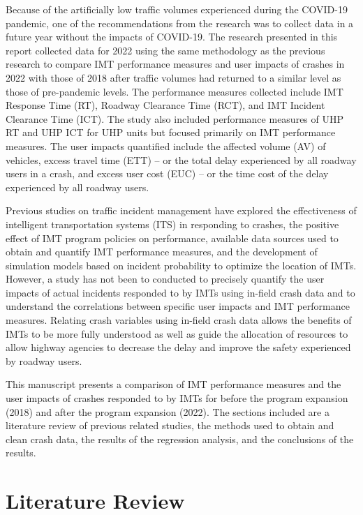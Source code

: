 \documentclass[
  letterpaper,
  authoryear]{elsarticle}
\begin{document}
Because of the artificially low traffic volumes experienced during the
COVID-19 pandemic, one of the recommendations from the research was to
collect data in a future year without the impacts of COVID-19. The
research presented in this report collected data for 2022 using the same
methodology as the previous research to compare IMT performance measures
and user impacts of crashes in 2022 with those of 2018 after traffic
volumes had returned to a similar level as those of pre-pandemic levels.
The performance measures collected include IMT Response Time (RT),
Roadway Clearance Time (RCT), and IMT Incident Clearance Time (ICT). The
study also included performance measures of UHP RT and UHP ICT for UHP
units but focused primarily on IMT performance measures. The user
impacts quantified include the affected volume (AV) of vehicles, excess
travel time (ETT) -- or the total delay experienced by all roadway users
in a crash, and excess user cost (EUC) -- or the time cost of the delay
experienced by all roadway users.

Previous studies on traffic incident management have explored the
effectiveness of intelligent transportation systems (ITS) in responding
to crashes, the positive effect of IMT program policies on performance,
available data sources used to obtain and quantify IMT performance
measures, and the development of simulation models based on incident
probability to optimize the location of IMTs. However, a study has not
been to conducted to precisely quantify the user impacts of actual
incidents responded to by IMTs using in-field crash data and to
understand the correlations between specific user impacts and IMT
performance measures. Relating crash variables using in-field crash data
allows the benefits of IMTs to be more fully understood as well as guide
the allocation of resources to allow highway agencies to decrease the
delay and improve the safety experienced by roadway users.

This manuscript presents a comparison of IMT performance measures and
the user impacts of crashes responded to by IMTs for before the program
expansion (2018) and after the program expansion (2022). The sections
included are a literature review of previous related studies, the
methods used to obtain and clean crash data, the results of the
regression analysis, and the conclusions of the results.


\section{Literature Review}\label{literature-review}
\end{document}
